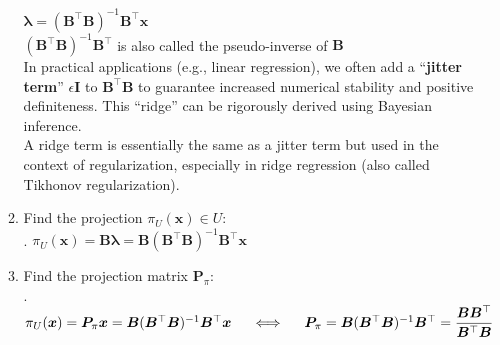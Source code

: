 \begin{enumerate}
\begin{enumerate}
        $
            \bm{\lambda} = (\bm{B}^\top \bm{B})^{-1} \bm{B}^\top \bm{x}
        $
        \hfill \cite{mfml/book/mml/Deisenroth-Faisal-Ong}
        \\
        $(\bm{B}^\top \bm{B})^{-1} \bm{B}^\top$ is also called the pseudo-inverse of $\bm{B}$
        \hfill \cite{mfml/book/mml/Deisenroth-Faisal-Ong}
        \\
        In practical applications (e.g., linear regression), we often add a “\textbf{jitter term}” $\epsilon \bm{I}$ to $\bm{B}^\top \bm{B}$ to guarantee increased numerical stability and positive definiteness. 
        This “ridge” can be rigorously derived using Bayesian inference. 
        \hfill \cite{mfml/book/mml/Deisenroth-Faisal-Ong}
        \\
        A ridge term is essentially the same as a jitter term but used in the context of regularization, especially in ridge regression (also called Tikhonov regularization). 
        \hfill \cite{common/online/chatgpt}

        \item Find the projection $\pi_U (\bm{x}) \in U$:
        \hfill \cite{mfml/book/mml/Deisenroth-Faisal-Ong}
        \\
        .\hfill
        $
            \pi_U (\bm{x}) 
            = \bm{B\lambda}
            = \bm{B} (\bm{B}^\top \bm{B})^{-1} \bm{B}^\top \bm{x}
        $
        \hfill \cite{mfml/book/mml/Deisenroth-Faisal-Ong}

        \item Find the projection matrix $\bm{P} _\pi$:
        \hfill \cite{mfml/book/mml/Deisenroth-Faisal-Ong}
        \\
        .\hfill
        $
            \pi_U (\bm{x}) = \bm{P} _\pi \bm{x} = \bm{B} (\bm{B}^\top \bm{B})^{-1} \bm{B}^\top \bm{x}
            \hspace{0.5cm}
            \Longleftrightarrow
            \hspace{0.5cm}
            \bm{P} _\pi 
                = \bm{B} (\bm{B}^\top \bm{B})^{-1} \bm{B}^\top
                = \dfrac{\bm{B}\bm{B}^\top}{\bm{B}^\top \bm{B}}
        $
        \hfill \cite{mfml/book/mml/Deisenroth-Faisal-Ong}
    \end{enumerate}
\end{enumerate}





